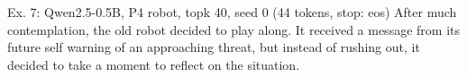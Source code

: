 \begin{modelout}{Ex. 7: Qwen2.5-0.5B, P4 robot, topk 40, seed 0 (44 tokens, stop: eos)}
\small After much contemplation, the old robot decided to play along. It received a message from its future self warning of an approaching threat, but instead of rushing out, it decided to take a moment to reflect on the situation.
\end{modelout}
